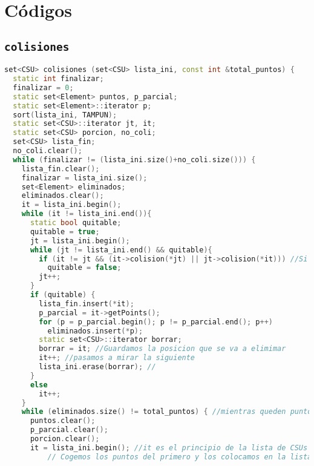 %
%
%
%
\chapter{Códigos}
\section{\texttt{colisiones}} \label{app:colis}

\begin{lstlisting}[language=C++, numbers=none,basicstyle=\ttfamily\footnotesize,
                   caption={Código de la función que reduce las colisiones
                   aleatorias},]
set<CSU> colisiones (set<CSU> lista_ini, const int &total_puntos) {
  static int finalizar;
  finalizar = 0;
  static set<Element> puntos, p_parcial;
  static set<Element>::iterator p;
  sort(lista_ini, TAMPUN);
  static set<CSU>::iterator jt, it;
  static set<CSU> porcion, no_coli;
  set<CSU> lista_fin;
  no_coli.clear();
  while (finalizar != (lista_ini.size()+no_coli.size())) {
    lista_fin.clear();
    finalizar = lista_ini.size();
    set<Element> eliminados;
    eliminados.clear();
    it = lista_ini.begin();
    while (it != lista_ini.end()){
      static bool quitable;
      quitable = true;
      jt = lista_ini.begin();
      while (jt != lista_ini.end() && quitable){
        if (it != jt && (it->colision(*jt) || jt->colision(*it))) //Si colisiona, no lo podemos quitar
          quitable = false;
        jt++;
      }
      if (quitable) {
        lista_fin.insert(*it);
        p_parcial = it->getPoints();
        for (p = p_parcial.begin(); p != p_parcial.end(); p++) 
          eliminados.insert(*p);
        static set<CSU>::iterator borrar;
        borrar = it; //Guardamos la posicion que se va a elimimar
        it++; //pasamos a mirar la siguiente
        lista_ini.erase(borrar); //    
      }                                
      else                             
        it++;                          
    }                                  
    while (eliminados.size() != total_puntos) { //mientras queden puntos por mirar
      puntos.clear();
      p_parcial.clear();
      porcion.clear();
      it = lista_ini.begin(); //it es el principio de la lista de CSUs
		  // Cogemos los puntos del primero y los colocamos en la lista de mejora 

\end{lstlisting}
